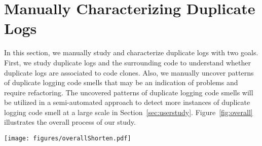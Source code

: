 \section{Manually Characterizing Duplicate Logs}
\label{sec:manual}


In this section, we manually study and characterize duplicate logs with two goals. First, we study duplicate logs and the surrounding code to understand whether duplicate logs are associated to code clones. Also, we manually uncover patterns of duplicate logging code smells that may be an indication of problems and require refactoring. The uncovered patterns of duplicate logging code smells will be utilized in a semi-automated approach to detect more instances of duplicate logging code smell at a large scale in Section~\ref{sec:userstudy}.
Figure~\ref{fig:overall} illustrates the overall process of our study. 

 \begin{figure*}
 \centering
\texttt{[image: figures/overallShorten.pdf]}
\vspace{-0.3cm}
 \caption{The overall process of our study.}
 \vspace{-0.3cm}
 \label{fig:overall}
 \end{figure*}





